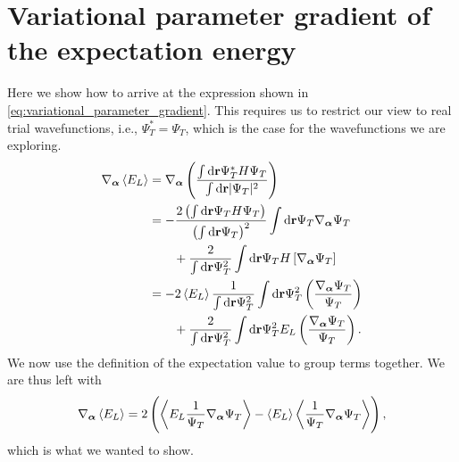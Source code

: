 \documentclass[
    a4paper, aps, twocolumn, floatfix, superscriptaddress,
    nofootinbib]{revtex4-1}
\newcommand{\vf}{\mathbf}
\newcommand{\vfg}{\boldsymbol}
\newcommand{\1}{\mathds{1}}
\newcommand{\para}[1]{\left(#1\right)}
\newcommand{\brak}[1]{\left[#1\right]}
\begin{document}
\section{Variational parameter gradient of the expectation energy}
    Here we show how to arrive at the expression shown in
    \autoref{eq:variational_parameter_gradient}. This requires us to restrict
    our view to real trial wavefunctions, i.e., $\Psi_T^{*} = \Psi_T$, which is
    the case for the wavefunctions we are exploring.
    \begin{align}
        \nabla_{\vfg{\alpha}}\expval{E_L}
        &=
        \nabla_{\vfg{\alpha}}
        \para{
            \frac{
                \int\dd\vf{r}\Psi_T^{*}H\Psi_T
            }{
                \int\dd\vf{r}|\Psi_T|^2
            }
        }
        \\
        &=
        -
        \frac{
            2
            \para{
                \int\dd\vf{r}\Psi_T H\Psi_T
            }
        }{\para{\int\dd\vf{r}\Psi_T}^2}
        \int\dd\vf{r}\Psi_T\nabla_{\vfg{\alpha}}\Psi_T
        \\
        &\qquad
        +
        \frac{2}{\int\dd\vf{r}\Psi_T^2}
        \int\dd\vf{r}\Psi_TH\brak{
            \nabla_{\vfg{\alpha}}\Psi_T
        }
        \\
        &=
        - 2\expval{E_L}
        \frac{1}{
            \int\dd\vf{r}\Psi_T^2
        }
        \int\dd\vf{r}\Psi_T^2\para{
            \frac{\nabla_{\vfg{\alpha}}\Psi_T}{\Psi_T}
        }
        \\
        &\qquad
        +
        \frac{2}{\int\dd\vf{r}\Psi_T^2}
        \int\dd\vf{r}\Psi_T^2 E_L\para{
            \frac{\nabla_{\vfg{\alpha}}\Psi_T}{\Psi_T}
        }.
    \end{align}
    We now use the definition of the expectation value to group terms together.
    We are thus left with
    \begin{align}
        \nabla_{\vfg{\alpha}}\expval{E_L}
        =
        2
        \para{
            \expval{
                E_L\frac{1}{\Psi_T}\nabla_{\vfg{\alpha}}\Psi_T
            }
            - \expval{E_L}
            \expval{\frac{1}{\Psi_T}\nabla_{\vfg{\alpha}}\Psi_T}
        },
    \end{align}
    which is what we wanted to show.

\clearpage
\onecolumngrid
\end{document}
